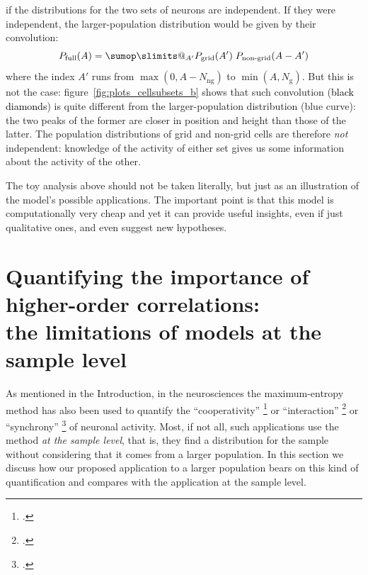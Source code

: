 \documentclass[\ifafour a4paper,12pt,\else a5paper,10pt,\fi%
onecolumn,oneside,article,%
british%
]{memoir}
\makeatletter
\theoremstyle{remark}
\theoremstyle{innote}
\def\sum{\DOTSI\sumop\slimits@}
\newcommand*{\citep}{\footcites}
\DeclarePairedDelimiter\set{\{}{\}}
\renewcommand*{\|}{\nonscript\,\vert\nonscript\;\mathopen{}}
\newcommand*{\eg}{{e.g.}}
\newcommand*{\yAv}{A}
\newcommand*{\yNg}{N_{\text{g}}}
\newcommand*{\yNng}{N_{\text{ng}}}
\newcommand*{\yA}{\yAv}%
\makeatother
\begin{document}
if the distributions for the two sets of neurons are independent. If they
were independent, the larger-population distribution would be given by
their convolution:
\begin{equation}
  \label{eq:convolution}
  P_{\text{full}}(\yA) = \sum_{\yA'} P_{\text{grid}}(\yA')\;
  P_{\text{non-grid}}(\yA-\yA') %
\end{equation}
where the index $\yA'$ runs from $\max(0,\yA-\yNng)$ to $\min(\yA,\yNg)$.
But this is not the case: 
figure~\ref{fig:plots_cellsubsets_b} shows that such convolution
(\textcolor{black}{black diamonds}) is quite different from the
larger-population distribution (\textcolor{myblue}{blue curve}): the two
peaks of the former are closer in position and height than those of the
latter. The population distributions of grid and non-grid cells are
therefore \emph{not} independent: knowledge of the activity of either set
gives us some information about the activity of the other.

\medskip

The toy analysis above should not be taken literally, but just as an
illustration of the model's possible applications. The important point is
that this model is computationally very cheap and yet it can provide
useful insights, even if just qualitative ones, and even suggest new
hypotheses.




\section{Quantifying the importance of higher-order correlations:\\
  the limitations of models at the sample level}
\label{sec:marginalization}

As mentioned in the Introduction, in the neurosciences the maximum-entropy
method has also been used to quantify the \enquote{cooperativity}
\citep[\eg][]{gersteinetal1985} or \enquote{interaction}
\citep[\eg][]{martignonetal1995,schneidmanetal2006,shlensetal2006} or
\enquote{synchrony} \citep[\eg]{bohteetal2000,amarietal2003} of neuronal
activity. Most, if not all, such applications use the method \emph{at the
  sample level}, that is, they find a distribution for the sample without
considering that it comes from a larger population. In this section we
discuss how our proposed application to a larger population bears on this
kind of quantification and compares with the application at the sample
level. %
\end{document}
